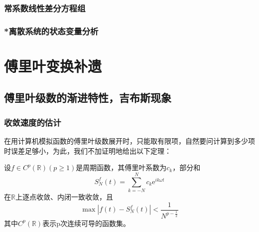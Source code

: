 \documentclass{ctexbook}
\begin{document}
\subsection{常系数线性差分方程组}\label{sub:difference_equation_system}

\subsection{*离散系统的状态变量分析}\label{sub:discrete_state_variable}

\appendix

\chapter{傅里叶变换补遗}

\section{傅里叶级数的渐进特性，吉布斯现象}\label{sec:Asymptotic_Behaviour}

\subsection{收敛速度的估计}\label{sub:converge_speed}
在用计算机模拟函数的傅里叶级数展开时，只能取有限项，自然要问计算到多少项时误差足够小，为此，我们不加证明地给出以下定理\cite{brad_osgood_ee261}：
\begin{theorem}
    设$f\in C^p(\mathbb{R} )(p\geq1)$是周期函数，其傅里叶系数为$c_k$，部分和
    \[S_N^f(t)=\sum_{k=-N}^{N}c_k \mathrm{e}^{ik\omega t}\]
    在$\mathbb{R} $上逐点收敛、内闭一致收敛，且
    \[\max\left|f(t)-S_N^f(t)\right|<\frac{1}{N^{p-\frac{1}{2}}}\]
其中$C^p(\mathbb{R} )$表示p次连续可导的函数集。
\end{theorem}
\end{document}
